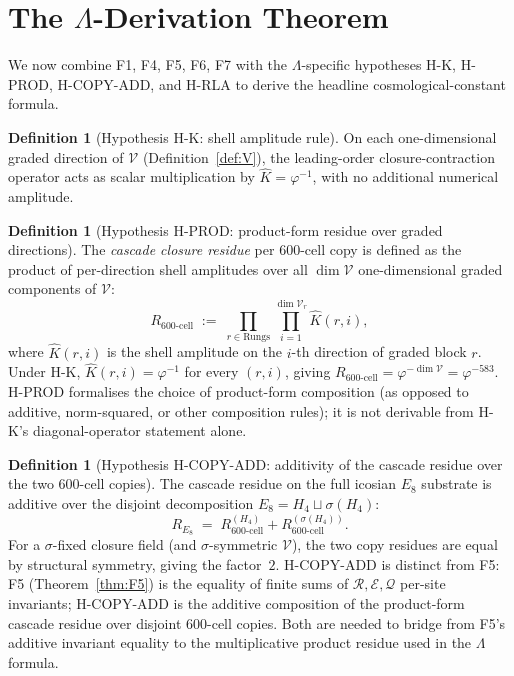 \documentclass[12pt]{article}
\theoremstyle{definition}
\newtheorem{definition}[theorem]{Definition}
\theoremstyle{remark}
\newcommand{\Vcal}{\mathcal{V}}
\begin{document}
\section{The $\Lambda$-Derivation Theorem}\label{sec:lambda}

We now combine F1, F4, F5, F6, F7 with the $\Lambda$-specific hypotheses H-K, H-PROD, H-COPY-ADD, and H-RLA to derive the headline cosmological-constant formula.

\begin{definition}[Hypothesis H-K: shell amplitude rule]\label{hyp:K}
On each one-dimensional graded direction of $\Vcal$ (Definition~\ref{def:V}), the leading-order closure-contraction operator acts as scalar multiplication by $\widehat{K} = \varphi^{-1}$, with no additional numerical amplitude.
\end{definition}

\begin{definition}[Hypothesis H-PROD: product-form residue over graded directions]\label{hyp:PROD}
The \emph{cascade closure residue} per 600-cell copy is defined as the product of per-direction shell amplitudes over all $\dim \Vcal$ one-dimensional graded components of $\Vcal$:
\begin{equation}\label{eq:residue-def}
R_{600\text{-cell}} \;:=\; \prod_{r \in \mathrm{Rungs}} \prod_{i=1}^{\dim \Vcal_r} \widehat{K}(r, i),
\end{equation}
where $\widehat{K}(r, i)$ is the shell amplitude on the $i$-th direction of graded block $r$. Under H-K, $\widehat{K}(r, i) = \varphi^{-1}$ for every $(r, i)$, giving $R_{600\text{-cell}} = \varphi^{-\dim \Vcal} = \varphi^{-583}$. H-PROD formalises the choice of product-form composition (as opposed to additive, norm-squared, or other composition rules); it is not derivable from H-K's diagonal-operator statement alone.
\end{definition}

\begin{definition}[Hypothesis H-COPY-ADD: additivity of the cascade residue over the two 600-cell copies]\label{hyp:COPY-ADD}
The cascade residue on the full icosian $E_8$ substrate is additive over the disjoint decomposition $E_8 = H_4 \sqcup \sigma(H_4)$:
\begin{equation}
R_{E_8} \;=\; R_{600\text{-cell}}^{(H_4)} + R_{600\text{-cell}}^{(\sigma(H_4))}.
\end{equation}
For a $\sigma$-fixed closure field (and $\sigma$-symmetric $\Vcal$), the two copy residues are equal by structural symmetry, giving the factor~$2$. H-COPY-ADD is distinct from F5: F5 (Theorem~\ref{thm:F5}) is the equality of finite sums of $\mathcal R, \mathcal E, \mathcal Q$ per-site invariants; H-COPY-ADD is the additive composition of the product-form cascade residue over disjoint 600-cell copies. Both are needed to bridge from F5's additive invariant equality to the multiplicative product residue used in the $\Lambda$ formula.
\end{definition}
\end{document}
